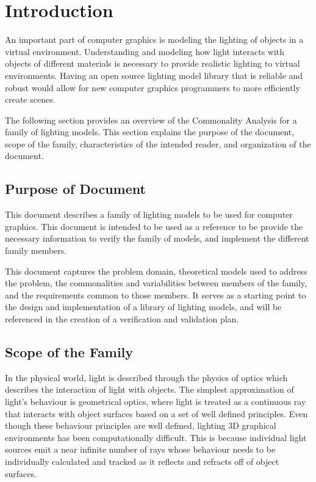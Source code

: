 \documentclass[12pt]{article}
\begin{document}
\section{Introduction}
An important part of computer graphics is modeling the lighting 
of objects in a virtual environment. Understanding and modeling how light 
interacts with objects of different materials is necessary to provide realistic 
lighting to virtual environments. Having an open source lighting model library 
that is reliable and robust would allow for new computer graphics programmers 
to more efficiently create scenes.

The following section provides an overview of the Commonality Analysis for a 
family of lighting models. This section explains the purpose of the document, 
scope of the family, characteristics of the intended reader, and organization 
of the document.

\subsection{Purpose of Document}
This document describes a family of lighting models to be used for computer 
graphics. This document is intended to be used as a reference to be provide the 
necessary information to verify the family of models, and implement the 
different family members. 

This document captures the problem domain, theoretical models used to address 
the problem, the commonalities and variabilities between members of the family, 
and the requirements common to those members. It serves as a starting point to 
the design and implementation of a library of lighting models, and will be 
referenced in the creation of a verification and validation plan.

\subsection{Scope of the Family} \label{sec_problem_definition}
In the physical world, light is described through the physics of optics which 
describes the interaction of light with objects. The simplest approximation of 
light's behaviour is geometrical optics, where light is treated as a continuous 
ray that interacts with object surfaces based on a set of well defined 
principles. Even though these behaviour principles are well defined, lighting 
3D graphical environments has been computationally difficult. This is because 
individual light sources emit a near infinite number of rays whose behaviour 
needs to be individually calculated and tracked as it reflects and refracts off 
of object surfaces.
\end{document}
